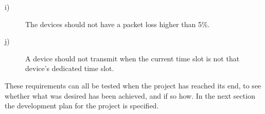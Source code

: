 \begin{description}
    \item[i)] The devices should not have a packet loss higher than 5\%.
    \item[j)] A device should not transmit when the current time slot is not that device's dedicated time slot. 
\end{description}

These requirements can all be tested when the project has reached its end, to see whether what was desired has been achieved, and if so how. 
In the next section the development plan for the project is specified.